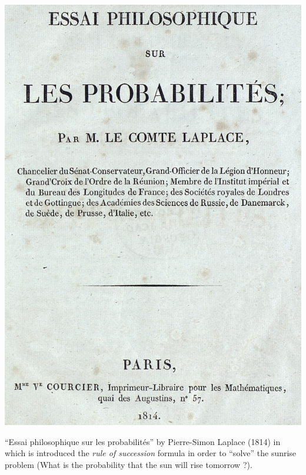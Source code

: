 \begin{marginfigure}[*2]
	\includegraphics{images/laplace.png}
	\caption{``Essai philosophique sur les probabilités'' by Pierre-Simon Laplace (1814) in which is introduced the \emph{rule of succession} formula in order to ``solve'' the sunrise problem (What is the probability that the sun will rise tomorrow ?).}
	\label{fig:rule-of-succession}
\end{marginfigure}

